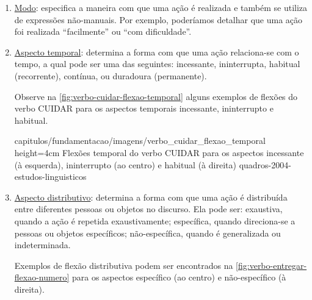 \begin{enumerate}
\begin{enumerate}
                    {capitulos/fundamentacao/imagens/sinais_lindo_lindinho_lindissimo} %
                    {height=4cm} %
                    {Flexões de grau para o sinal LINDO} %
                    {pereira-2011-conhecimento-alem-sinais} %


              \item \underline{Modo}: especifica a maneira com que uma ação é realizada e também se utiliza de expressões não-manuais.
                    Por exemplo, poderíamos detalhar que uma ação foi realizada ``facilmente'' ou ``com dificuldade''.


              \item \underline{Aspecto temporal}: determina a forma com que uma ação relaciona-se com o tempo, a qual pode ser uma das seguintes: incessante, ininterrupta, habitual (recorrente), contínua, ou duradoura (permanente).

                    Observe na \autoref{fig:verbo-cuidar-flexao-temporal} alguns exemplos de flexões do verbo CUIDAR para os aspectos temporais incessante, ininterrupto e habitual.

                    {capitulos/fundamentacao/imagens/verbo_cuidar_flexao_temporal} %
                    {height=4cm} %
                    {Flexões temporal do verbo CUIDAR para os aspectos incessante (à esquerda), ininterrupto (ao centro) e habitual (à direita)} %
                    {quadros-2004-estudos-linguisticos} %




              \item \underline{Aspecto distributivo}: determina a forma com que uma ação é distribuída entre diferentes pessoas ou objetos no discurso.
                    Ela pode ser: exaustiva, quando a ação é repetida exaustivamente; específica, quando direciona-se a pessoas ou objetos específicos; não-específica, quando é generalizada ou indeterminada.

                    Exemplos de flexão distributiva podem ser encontrados na \autoref{fig:verbo-entregar-flexao-numero} para os aspectos específico (ao centro) e não-específico (à direita).


\end{enumerate}
\end{enumerate}

